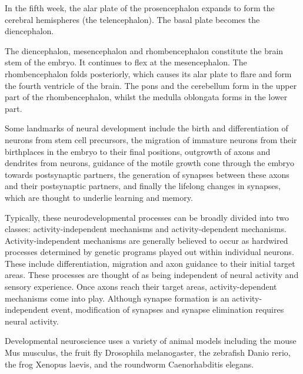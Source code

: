 In the fifth week, the alar plate of the prosencephalon expands to form the cerebral hemispheres (the telencephalon). The basal plate becomes the diencephalon.

The diencephalon, mesencephalon and rhombencephalon constitute the brain stem of the embryo. It continues to flex at the mesencephalon. The rhombencephalon folds posteriorly, which causes its alar plate to flare and form the fourth ventricle of the brain. The pons and the cerebellum form in the upper part of the rhombencephalon, whilst the medulla oblongata forms in the lower part.

Some landmarks of neural development include the birth and differentiation of neurons from stem cell precursors, the migration of immature neurons from their birthplaces in the embryo to their final positions, outgrowth of axons and dendrites from neurons, guidance of the motile growth cone through the embryo towards postsynaptic partners, the generation of synapses between these axons and their postsynaptic partners, and finally the lifelong changes in synapses, which are thought to underlie learning and memory.

Typically, these neurodevelopmental processes can be broadly divided into two classes: activity-independent mechanisms and activity-dependent mechanisms. Activity-independent mechanisms are generally believed to occur as hardwired processes determined by genetic programs played out within individual neurons. These include differentiation, migration and axon guidance to their initial target areas. These processes are thought of as being independent of neural activity and sensory experience. Once axons reach their target areas, activity-dependent mechanisms come into play. Although synapse formation is an activity-independent event, modification of synapses and synapse elimination requires neural activity.

Developmental neuroscience uses a variety of animal models including the mouse Mus musculus, the fruit fly Drosophila melanogaster, the zebrafish Danio rerio, the frog Xenopus laevis, and the roundworm Caenorhabditis elegans.

